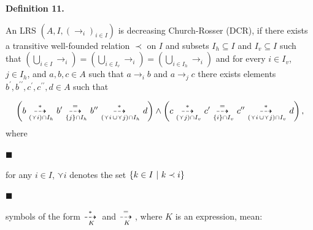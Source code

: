  
 
 
\par\medskip\noindent\textbf{Definition 11.}\par
 
 
An LRS $(A,I,(\to_{i})_{i\in I})$ is decreasing Church-Rosser (DCR), if there exists a transitive well-founded relation $\prec$ on $I$ and subsets $I_{h}\subseteq I$ and $I_{v}\subseteq I$ such that $\left(\bigcup_{i\in I}\to_{i}\right)=\left(\bigcup_{i\in I_{v}}\to_{i}\right)=%
\left(\bigcup_{i\in I_{h}}\to_{i}\right)$ and for every $i\in I_{v}$, $j\in I_{h}$, and $a,b,c\in A$ such that $a\to_{i}b$ and $a\to_{j}c$ there exists elements $b^{\prime},b^{\prime\prime},c^{\prime},c^{\prime\prime},d\in A$ such that\par
    \[\left(b\leavevmode\nobreak\ {\mathop{\buildrel*\over{\dashrightarrow}\;}%
\limits_{(\curlyvee i)\cap I_{h}}}\leavevmode\nobreak\ b^{\prime}\leavevmode%
\nobreak\ {\mathop{\buildrel=\over{\dashrightarrow}\;}\limits_{\{j\}\cap I_{h}%
}}\leavevmode\nobreak\ b^{\prime\prime}\leavevmode\nobreak\ {\mathop{\buildrel%
*\over{\dashrightarrow}\;}\limits_{(\curlyvee i\,\cup\curlyvee j)\cap I_{h}}}%
\leavevmode\nobreak\ d\right)\wedge\left(c\leavevmode\nobreak\ {\mathop{%
\buildrel*\over{\dashrightarrow}\;}\limits_{(\curlyvee j)\cap I_{v}}}%
\leavevmode\nobreak\ c^{\prime}\leavevmode\nobreak\ {\mathop{\buildrel=\over{%
\dashrightarrow}\;}\limits_{\{i\}\cap I_{v}}}\leavevmode\nobreak\ c^{\prime%
\prime}\leavevmode\nobreak\ {\mathop{\buildrel*\over{\dashrightarrow}\;}%
\limits_{(\curlyvee i\,\cup\curlyvee j)\cap I_{v}}}\leavevmode\nobreak\ d%
\right),\]    
where\par
  
\par\noindent  $\blacksquare$ 
 
for any $i\in I$, $\curlyvee i$ denotes the set $\{k\in I\leavevmode\nobreak\ |\leavevmode\nobreak\ k\prec i\}$\par
 
 
 
\par\noindent  $\blacksquare$ 
 
symbols of the form ${\mathop{\buildrel*\over{\dashrightarrow}\;}\limits_{K}}$ and ${\mathop{\buildrel=\over{\dashrightarrow}\;}\limits_{K}}$, where $K$ is an expression, mean:\par
 
